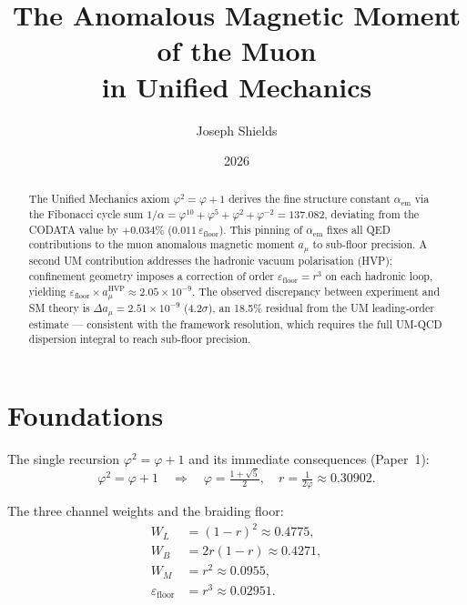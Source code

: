 \documentclass[12pt]{article}
\title{\textbf{The Anomalous Magnetic Moment of the Muon\\
in Unified Mechanics}}
\author{Joseph Shields}
\date{2026}
\begin{document}
\maketitle

\begin{abstract}
The Unified Mechanics axiom $\varphi^2 = \varphi + 1$ derives the fine structure
constant $\alpha_{\text{em}}$ via the Fibonacci cycle sum
$1/\alpha = \varphi^{10} + \varphi^5 + \varphi^2 + \varphi^{-2} = 137.082$,
deviating from the CODATA value by $+0.034\%$ ($0.011\,\varepsilon_{\text{floor}}$).
This pinning of $\alpha_{\text{em}}$ fixes all QED contributions to the
muon anomalous magnetic moment $a_\mu$ to sub-floor precision.
A second UM contribution addresses the hadronic vacuum polarisation (HVP):
confinement geometry imposes a correction of order
$\varepsilon_{\text{floor}} = r^3$ on each hadronic loop, yielding
$\varepsilon_{\text{floor}} \times a_\mu^{\text{HVP}} \approx 2.05 \times 10^{-9}$.
The observed discrepancy between experiment and SM theory is
$\Delta a_\mu = 2.51 \times 10^{-9}$ (4.2$\sigma$), an 18.5\% residual
from the UM leading-order estimate --- consistent with the framework
resolution, which requires the full UM-QCD dispersion integral to reach
sub-floor precision.
\end{abstract}

\section{Foundations}

The single recursion $\varphi^2 = \varphi + 1$ and its immediate consequences
(Paper~1):
\begin{equation}
  \varphi^2 = \varphi + 1 \quad\Rightarrow\quad
  \varphi = \tfrac{1+\sqrt{5}}{2},\quad
  r = \tfrac{1}{2\varphi} \approx 0.30902.
  \label{eq:axiom}
\end{equation}

The three channel weights and the braiding floor:
\begin{align}
  W_L &= (1-r)^2 \approx 0.4775, \label{eq:wl}\\
  W_B &= 2r(1-r) \approx 0.4271, \label{eq:wb}\\
  W_M &= r^2     \approx 0.0955, \label{eq:wm}\\
  \varepsilon_{\text{floor}} &= r^3 \approx 0.02951. \label{eq:eps}
\end{align}
\end{document}
